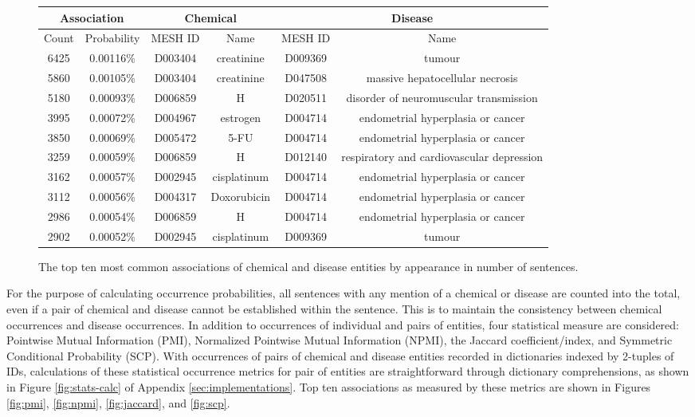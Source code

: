 \documentclass[10pt, oneside]{article}
\begin{document}
\begin{figure}[h]
\begin{center}
\fontsize{9}{11}\selectfont
\begin{tabular}{|*{6}{c|}}\hline
\multicolumn{2}{|c|}{\textbf{Association}} & \multicolumn{2}{c|}{\textbf{Chemical}} & \multicolumn{2}{c|}{\textbf{Disease}} \\ \hline 
Count & Probability & MESH ID & Name & MESH ID & Name \\ \hline 
6425 & 0.00116\% & D003404 & creatinine & D009369 & tumour \\ \hline
5860 & 0.00105\% & D003404 & creatinine & D047508 & massive hepatocellular necrosis \\ \hline
5180 & 0.00093\% & D006859 & H & D020511 & disorder of neuromuscular transmission \\ \hline
3995 & 0.00072\% & D004967 & estrogen & D004714 & endometrial hyperplasia or cancer \\ \hline
3850 & 0.00069\% & D005472 & 5-FU & D004714 & endometrial hyperplasia or cancer \\ \hline
3259 & 0.00059\% & D006859 & H & D012140 & respiratory and cardiovascular depression \\ \hline
3162 & 0.00057\% & D002945 & cisplatinum & D004714 & endometrial hyperplasia or cancer \\ \hline
3112 & 0.00056\% & D004317 & Doxorubicin & D004714 & endometrial hyperplasia or cancer \\ \hline
2986 & 0.00054\% & D006859 & H & D004714 & endometrial hyperplasia or cancer \\ \hline
2902 & 0.00052\% & D002945 & cisplatinum & D009369 & tumour \\ \hline
\end{tabular}
\caption{\label{fig:popular-pairs} The top ten most common associations of chemical and disease entities by appearance in number of sentences.}
\end{center}
\end{figure}

For the purpose of calculating occurrence probabilities, all sentences with any mention of a chemical or disease are counted into the total, even if a pair of chemical and disease cannot be established within the sentence. This is to maintain the consistency between chemical occurrences and disease occurrences. In addition to occurrences of individual and pairs of entities, four statistical measure are considered: Pointwise Mutual Information (PMI), Normalized Pointwise Mutual Information (NPMI), the Jaccard coefficient/index, and Symmetric Conditional Probability (SCP). With occurrences of pairs of chemical and disease entities recorded in dictionaries indexed by 2-tuples of IDs, calculations of these statistical occurrence metrics for pair of entities are straightforward through dictionary comprehensions, as shown in Figure \ref{fig:stats-calc} of Appendix \ref{sec:implementations}. Top ten associations as measured by these metrics are shown in Figures \ref{fig:pmi}, \ref{fig:npmi}, \ref{fig:jaccard}, and \ref{fig:scp}.
\end{document}
